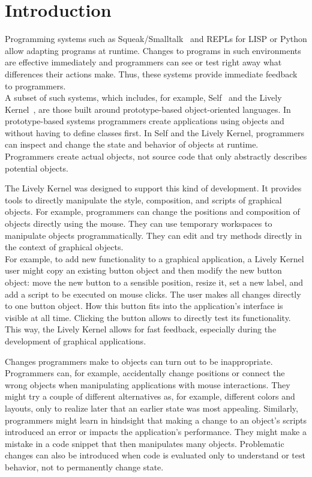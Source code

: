 
\chapter{Introduction} \label{chapter:INTRODUCTION}

Programming systems such as Squeak/Smalltalk~\cite{Ingalls1997Squeak,GoldbergRobson83} and REPLs for LISP or Python allow adapting programs at runtime.
Changes to programs in such environments are effective immediately and programmers can see or test right away what differences their actions make.
Thus, these systems provide immediate feedback to programmers.\\
A subset of such systems, which includes, for example, Self~\cite{Ungar1987SPS,Ungar2007SEL} and the Lively Kernel~\cite{Ingalls2008LKS,Krahn2009LWD}, are those built around prototype-based object-oriented languages.
In prototype-based systems programmers create applications using objects and without having to define classes first.
In Self and the Lively Kernel, programmers can inspect and change the state and behavior of objects at runtime.
Programmers create actual objects, not source code that only abstractly describes potential objects.

The Lively Kernel was designed to support this kind of development.
It provides tools to directly manipulate the style, composition, and scripts of graphical objects.
For example, programmers can change the positions and composition of objects directly using the mouse.
They can use temporary workspaces to manipulate objects programmatically.
They can edit and try methods directly in the context of graphical objects.\\
For example, to add new functionality to a graphical application, a Lively Kernel user might copy an existing button object and then modify the new button object: move the new button to a sensible position, resize it, set a new label, and add a script to be executed on mouse clicks.
The user makes all changes directly to one button object.
How this button fits into the application's interface is visible at all time.
Clicking the button allows to directly test its functionality.
This way, the Lively Kernel allows for fast feedback, especially during the development of graphical applications.

Changes programmers make to objects can turn out to be inappropriate.
Programmers can, for example, accidentally change positions or connect the wrong objects when manipulating applications with mouse interactions.
They might try a couple of different alternatives as, for example, different colors and layouts, only to realize later that an earlier state was most appealing.
Similarly, programmers might learn in hindsight that making a change to an object's scripts introduced an error or impacts the application's performance.
They might make a mistake in a code snippet that then manipulates many objects.
Problematic changes can also be introduced when code is evaluated only to understand or test behavior, not to permanently change state.

